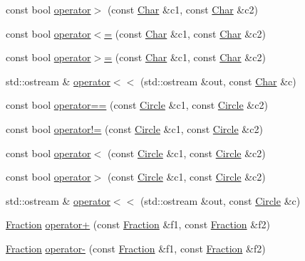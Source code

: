\begin{DoxyCompactItemize}
\item 
const bool \hyperlink{namespaceprism_ab8a312729c4c9ae72836d0034a6f0758}{operator$>$} (const \hyperlink{classprism_1_1_char}{Char} \&c1, const \hyperlink{classprism_1_1_char}{Char} \&c2)
\item 
const bool \hyperlink{namespaceprism_a87d86e9266469c8a40537e12a560b066}{operator$<$=} (const \hyperlink{classprism_1_1_char}{Char} \&c1, const \hyperlink{classprism_1_1_char}{Char} \&c2)
\item 
const bool \hyperlink{namespaceprism_aad049ddef9beb3fec3e7057a7f651280}{operator$>$=} (const \hyperlink{classprism_1_1_char}{Char} \&c1, const \hyperlink{classprism_1_1_char}{Char} \&c2)
\item 
std\+::ostream \& \hyperlink{namespaceprism_aa67ea1154a35dabe9c2c232aff65e930}{operator$<$$<$} (std\+::ostream \&out, const \hyperlink{classprism_1_1_char}{Char} \&c)
\item 
const bool \hyperlink{namespaceprism_a0ce1ad6e6392618212d5ab3bebb8e585}{operator==} (const \hyperlink{classprism_1_1_circle}{Circle} \&c1, const \hyperlink{classprism_1_1_circle}{Circle} \&c2)
\item 
const bool \hyperlink{namespaceprism_a58cbf7ef406800002b446a0f1e917745}{operator!=} (const \hyperlink{classprism_1_1_circle}{Circle} \&c1, const \hyperlink{classprism_1_1_circle}{Circle} \&c2)
\item 
const bool \hyperlink{namespaceprism_a8e662d15b162ca76912c491798caefd3}{operator$<$} (const \hyperlink{classprism_1_1_circle}{Circle} \&c1, const \hyperlink{classprism_1_1_circle}{Circle} \&c2)
\item 
const bool \hyperlink{namespaceprism_a671739ac8567654dba563c34af92213f}{operator$>$} (const \hyperlink{classprism_1_1_circle}{Circle} \&c1, const \hyperlink{classprism_1_1_circle}{Circle} \&c2)
\item 
std\+::ostream \& \hyperlink{namespaceprism_aa63d3d39d3fad8fa5c5966cc4f306324}{operator$<$$<$} (std\+::ostream \&out, const \hyperlink{classprism_1_1_circle}{Circle} \&c)
\item 
\hyperlink{classprism_1_1_fraction}{Fraction} \hyperlink{namespaceprism_ac1b5b2765c314b2baa2dba5c57419829}{operator+} (const \hyperlink{classprism_1_1_fraction}{Fraction} \&f1, const \hyperlink{classprism_1_1_fraction}{Fraction} \&f2)
\item 
\hyperlink{classprism_1_1_fraction}{Fraction} \hyperlink{namespaceprism_a2daf470e5f35f8450447deb2634c22c1}{operator-\/} (const \hyperlink{classprism_1_1_fraction}{Fraction} \&f1, const \hyperlink{classprism_1_1_fraction}{Fraction} \&f2)

\end{DoxyCompactItemize}
